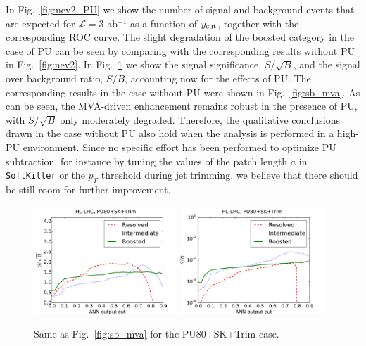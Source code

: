 In Fig.~\ref{fig:nev2_PU}
we show the number of signal and background events that
are expected for $\mathcal{L}=3$ ab$^{-1}$
as a function of
$y_{\rm cut}$, together with the corresponding ROC curve.
%
The slight degradation of the boosted category in the case
of PU can be seen by comparing with the corresponding
results without PU in Fig.~\ref{fig:nev2}.
%
In Fig.~\ref{fig:sb_mva_PU} we show the signal significance,
$S/\sqrt{B}$, and the signal over background ratio,
$S/B$, accounting now for the effects of PU.
%
The corresponding results in the case without PU were shown in
Fig.~\ref{fig:sb_mva}.
%
As can be seen, the MVA-driven enhancement remains robust in the
presence of PU, with $S/\sqrt{B}$ only moderately degraded.
%
Therefore, the qualitative conclusions drawn
in the case without PU also hold when the analysis
is performed in a high-PU environment.
%
Since no specific effort has been performed to
optimize PU subtraction, for instance by tuning the values
of the patch length $a$ in {\tt SoftKiller}
or the $p_T$ threshold during jet trimming,
we believe that
there should be still room for further improvement.

\begin{figure}[t]
\begin{center}
\includegraphics[width=0.48\textwidth]{plots/ssb_SKPU80.pdf}
\includegraphics[width=0.48\textwidth]{plots/sb_SKPU80.pdf}
\caption{\small 
  Same as Fig.~\ref{fig:sb_mva} for
  the PU80+SK+Trim case.
}
\label{fig:sb_mva_PU}
\end{center}
\end{figure}

